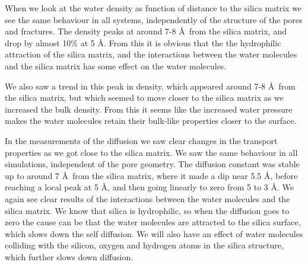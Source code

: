 When we look at the water density as function of distance to the silica matrix we see the same behaviour in all systems, independently of the structure of the pores and fractures. The density peaks at around 7-8 \AA\ from the silica matrix, and drop by almost 10\% at 5 \AA. From this it is obvious that the the hydrophilic attraction of the silica matrix, and the interactions between the water molecules and the silica matrix has some effect on the water molecules.

We also saw a trend in this peak in density, which appeared around 7-8 \AA\ from the silica matrix, but which seemed to move closer to the silica matrix as we increased the bulk density. From this it seems like the increased water pressure makes the water molecules retain their bulk-like properties closer to the surface.


In the measurements of the diffusion we saw clear changes in the transport properties as we got close to the silica matrix. We saw the same behaviour in all simulations, independent of the pore geometry. The diffusion constant was stable up to around 7 \AA\ from the silica matrix, where it made a dip near 5.5 \AA, before reaching a local peak at 5 \AA, and then going linearly to zero from 5 to 3 \AA. We again see clear results of the interactions between the water molecules and the silica matrix. We know that silica is hydrophilic, so when the diffusion goes to zero the cause can be that the water molecules are attracted to the silica surface, which slows down the self diffusion. We will also have an effect of water molecules colliding with the silicon, oxygen and hydrogen atoms in the silica structure, which further slows down diffusion. 

